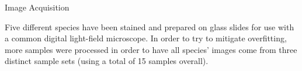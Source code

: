 Image Acquisition

Five different species have been stained and prepared on glass slides for use with a common digital light-field microscope. In order to try to mitigate overfitting, more samples were processed in order to have all species’ images come from three distinct sample sets (using a total of 15 samples overall).
  